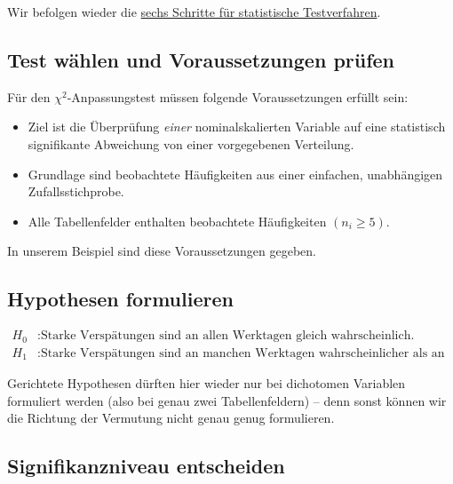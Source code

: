 \documentclass[
  11pt,
  ngerman,
  a4paper,
]{report}
\providecommand{\tightlist}{%
  \setlength{\itemsep}{0pt}\setlength{\parskip}{0pt}}
\begin{document}
Wir befolgen wieder die \protect\hyperlink{statistische-tests}{sechs Schritte für statistische Testverfahren}.

\hypertarget{test-wuxe4hlen-und-voraussetzungen-pruxfcfen-5}{%
\subsection{Test wählen und Voraussetzungen prüfen}\label{test-wuxe4hlen-und-voraussetzungen-pruxfcfen-5}}

Für den \(\chi^2\)-Anpassungstest müssen folgende Voraussetzungen erfüllt sein:

\begin{itemize}
\tightlist
\item
  Ziel ist die Überprüfung \emph{einer} nominalskalierten Variable auf eine statistisch signifikante Abweichung von einer vorgegebenen Verteilung.
\item
  Grundlage sind beobachtete Häufigkeiten aus einer einfachen, unabhängigen Zufallsstichprobe.
\item
  Alle Tabellenfelder enthalten beobachtete Häufigkeiten \((n_{i}\geq 5)\).
\end{itemize}

In unserem Beispiel sind diese Voraussetzungen gegeben.

\hypertarget{hypothesen-formulieren-5}{%
\subsection{Hypothesen formulieren}\label{hypothesen-formulieren-5}}

\[\begin{aligned}
H_0 &: \textrm{Starke Verspätungen sind an allen Werktagen gleich wahrscheinlich.}\\
H_1 &: \textrm{Starke Verspätungen sind an manchen Werktagen wahrscheinlicher als an anderen.}
\end{aligned}\]

Gerichtete Hypothesen dürften hier wieder nur bei dichotomen Variablen formuliert werden (also bei genau zwei Tabellenfeldern) -- denn sonst können wir die Richtung der Vermutung nicht genau genug formulieren.

\hypertarget{signifikanzniveau-entscheiden-5}{%
\subsection{Signifikanzniveau entscheiden}\label{signifikanzniveau-entscheiden-5}}
\end{document}
